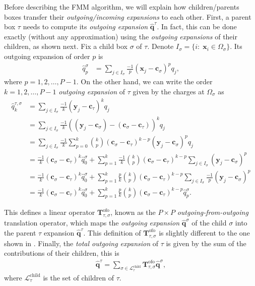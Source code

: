 \documentclass[final,onefignum,onetabnum]{siamart220329}
\newcommand{\bol}{\boldsymbol}
\newcommand{\Lcal}{\mathcal{L}}
\newcommand{\Tbf}{\mathbf{T}}
\begin{document}
Before describing the FMM algorithm, we will explain how children/parents boxes transfer their \textit{outgoing/incoming expansions} to each other. First, a parent box $\tau$ needs to compute its \textit{outgoing expansion} $\bol{\hat{q}}^\tau$. In fact, this can be done exactly (without any approximation) using the \textit{outgoing expansions} of their children, as shown next. Fix a child box $\sigma$ of $\tau$. Denote $I_\sigma=\{i:\; \bol x_i\in \Omega_\sigma\}$. Its outgoing expansion of order $p$ is
\begin{align}
	\hat{q}_p^\sigma &= \sum_{j\in I_\sigma} \frac{-1}{p}(\bol x_j-\bol c_\sigma)^p q_j,
\end{align}
where $p=1,2,\dots,P-1$. On the other hand, we can write the order $k=1,2,\dots,P-1$ \textit{outgoing expansion} of $\tau$ given by the charges at $\Omega_\sigma$ as
\begin{align}
	\hat{q}_k^{\tau,\sigma} &= \sum_{j\in I_\sigma} \frac{-1}{k}(\bol y_j-\bol c_\tau)^k q_j\\
	&=\sum_{j\in I_\sigma} \frac{-1}{k}((\bol y_j-\bol c_\sigma) - (\bol c_\sigma-\bol c_\tau))^k q_j\\
	&= \sum_{j\in I_\sigma} \frac{-1}{k}\sum_{p=0}^{k} \binom{k}{p} (\bol c_\sigma-\bol c_\tau)^{k-p}(\bol y_j-\bol c_\sigma)^p q_j	\\
	&= \frac{-1}{k} (\bol c_\sigma-\bol c_\tau)^{k}\hat{q}_0^\sigma + \sum_{p=1}^{k} \frac{-1}{k}\binom{k}{p} (\bol c_\sigma-\bol c_\tau)^{k-p}\sum_{j\in I_\sigma}(\bol y_j-\bol c_\sigma)^p\\
	&= \frac{-1}{k} (\bol c_\sigma-\bol c_\tau)^{k}\hat{q}_0^\sigma + \sum_{p=1}^{k} \frac{p}{k}\binom{k}{p} (\bol c_\sigma-\bol c_\tau)^{k-p}\sum_{j\in I_\sigma}\frac{-1}{p}(\bol y_j-\bol c_\sigma)^p\\
	&= \frac{-1}{k} (\bol c_\sigma-\bol c_\tau)^{k}\hat{q}_0^\sigma + \sum_{p=1}^{k} \frac{p}{k}\binom{k}{p} (\bol c_\sigma-\bol c_\tau)^{k-p}\hat{q}_p^\sigma. \label{eq:Tofo}
\end{align}

This defines a linear operator $\Tbf_{\tau,\sigma}^\text{ofo}$, known as the $P\times P$ \textit{outgoing-from-outgoing} translation operator, which maps the \textit{outgoing expansion} $\bol{\hat{q}}^{\sigma}$ of the child $\sigma$ into the parent $\tau$ expansion $\bol{\hat{q}}^{\tau}$. This definition of $\Tbf_{\tau,\sigma}^\text{ofo}$ is slightly different to the one shown in \cite{martinsson2019fast}. Finally, the \textit{total outgoing expansion} of $\tau$ is given by the sum of the contributions of their children, this is
\begin{align}
	\bol{\hat{q}}^{\tau} = \sum_{\sigma \in \Lcal_\tau^\text{child}} \Tbf_{\tau,\sigma}^\text{ofo} \bol{\hat{q}}^{\sigma},
\end{align}
where $\Lcal_\tau^\text{child}$ is the set of children of $\tau$.
\end{document}
